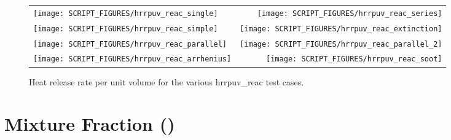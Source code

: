 \documentclass[11pt]{book}
\begin{document}
\begin{figure}[p]
\begin{tabular*}{\textwidth}{lr}
\texttt{[image: SCRIPT\_FIGURES/hrrpuv\_reac\_single]} &
\texttt{[image: SCRIPT\_FIGURES/hrrpuv\_reac\_series]} \\
\texttt{[image: SCRIPT\_FIGURES/hrrpuv\_reac\_simple]} &
\texttt{[image: SCRIPT\_FIGURES/hrrpuv\_reac\_extinction]} \\
\texttt{[image: SCRIPT\_FIGURES/hrrpuv\_reac\_parallel]} &
\texttt{[image: SCRIPT\_FIGURES/hrrpuv\_reac\_parallel\_2]} \\
\texttt{[image: SCRIPT\_FIGURES/hrrpuv\_reac\_arrhenius]} &
\texttt{[image: SCRIPT\_FIGURES/hrrpuv\_reac\_soot]}
\end{tabular*}
\caption[Results of the {\ct hrrpuv\_reac} test cases]{Heat release rate per unit volume for the various {\ct hrrpuv\_reac} test cases.}
\label{hrrpuv_reac_figures}
\end{figure}



\section{Mixture Fraction ()}
\label{Mix_Frac}
\label{burke_schumann_spec}
\label{burke_schumann_temp}
\end{document}
